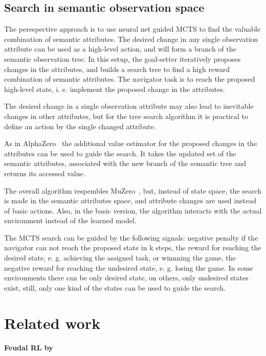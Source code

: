 \documentclass[acmsmall, nonacm]{acmart}
\begin{document}
\subsection{Search in semantic observation space}

The perespective approach is to use neural net guided MCTS to find the valuable combination of semantic attributes. The desired change in any single observation attribute can be used as a high-level action, and will form a branch of the semantic observation tree. In this setup, the goal-setter iteratively proposes changes in the attributes, and builds a search tree to find a high reward combination of semantic attributes. The navigator task is to reach the proposed high-level state, i. e. implement the proposed change in the attributes.

The desired change in a single observation attribute may also lead to inevitable changes in other attributes, but for the tree search algorithm it is practical to define an action by the single changed attribute.

As in AlphaZero~\cite{silver2017mastering} the additional value estimator for the proposed changes in the attributes can be used to guide the search. It takes the updated set of the semantic attributes, associated with the new branch of the semantic tree and returns its accessed value.

The overall algorithm respembles MuZero~\cite{schrittwieser2020mastering}, but, instead of state space, the search is made in the semantic attributes space, and attribute changes are used instead of basic actions. Also, in the basic version, the algorithm interacts with the actual environment instead of the learned model.

The MCTS search can be guided by the following signals: negative penalty if the navigator can not reach the proposed state in k steps, the reward for reaching the desired state, e. g. achieving the assigned task, or winnning the game, the negative reward for reaching the undesired state, e. g. losing the game. In some environments there can be only desired state, on others, only undesired states exist, still, only one kind of the states can be used to guide the search.

\section{Related work}
\label{sec:related_work}

\paragraph{Feudal RL by~\citet{Dayan1992FeudalRL}} %
\label{par:feudal_rl}
\end{document}
